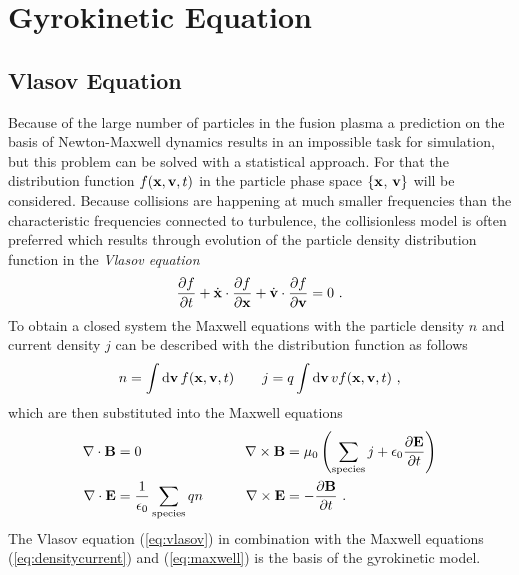 \newpage
\section{Gyrokinetic Equation}
\label{sec:gyrokinetic}

\subsection{Vlasov Equation}
\label{sub:vlasov}

Because of the large number of particles in the fusion plasma a prediction on the basis of Newton-Maxwell dynamics results in an impossible task for simulation, but this problem can be solved with a statistical approach. For that the distribution function $f(\boldsymbol{\mathbf{x}}, \boldsymbol{\mathbf{v}}, t)$ in the particle phase space $\{\boldsymbol{\mathbf{x}}$, $\boldsymbol{\mathbf{v}}\}$ will be considered. Because collisions are happening at much smaller frequencies than the characteristic frequencies connected to turbulence, the collisionless model is often preferred \cite{Garbet2010} which results through evolution of the particle density distribution function in the \textit{Vlasov equation}
\begin{gather}
	\frac{\partial f}{\partial t} + \dot{\boldsymbol{\mathbf{x}}} \cdot \frac{\partial f}{\partial \boldsymbol{\mathbf{x}}}  + \dot{\boldsymbol{\mathbf{v}}} \cdot \frac{\partial f}{\partial \boldsymbol{\mathbf{v}}} = 0~.
	\label{eq:vlasov}
\end{gather}
To obtain a closed system the Maxwell equations with the particle density $n$ and current density $j$ can be described with the distribution function as follows
\begin{gather}
	n = \int \mathrm{d}\boldsymbol{\mathbf{v}}\,f(\boldsymbol{\mathbf{x}}, \boldsymbol{\mathbf{v}}, t) \qquad j = q \int \mathrm{d}\boldsymbol{\mathbf{v}}\, v f(\boldsymbol{\mathbf{x}}, \boldsymbol{\mathbf{v}}, t)~,
	\label{eq:densitycurrent}
\end{gather}
which are then substituted into the Maxwell equations
\begin{gather}
	\begin{aligned}
		\nabla \cdot \boldsymbol{\mathbf{B}} &= 0 &\qquad \nabla \times \boldsymbol{\mathbf{B}} &= \mu_0\left( \sum_\mathrm{species} j + \epsilon_0 \frac{\partial \boldsymbol{\mathbf{E}}}{\partial t} \right) \\
		\nabla \cdot \boldsymbol{\mathbf{E}} &= \frac{1}{\epsilon_0} \sum_\mathrm{species} qn &\qquad \nabla \times \boldsymbol{\mathbf{E}} &= - \frac{\partial \boldsymbol{\mathbf{B}}}{\partial t}~.
	\end{aligned}
	\label{eq:maxwell}
\end{gather}
The Vlasov equation (\ref{eq:vlasov}) in combination with the Maxwell equations (\ref{eq:densitycurrent}) and (\ref{eq:maxwell}) is the basis of the gyrokinetic model. \cite{Krommes2012}

